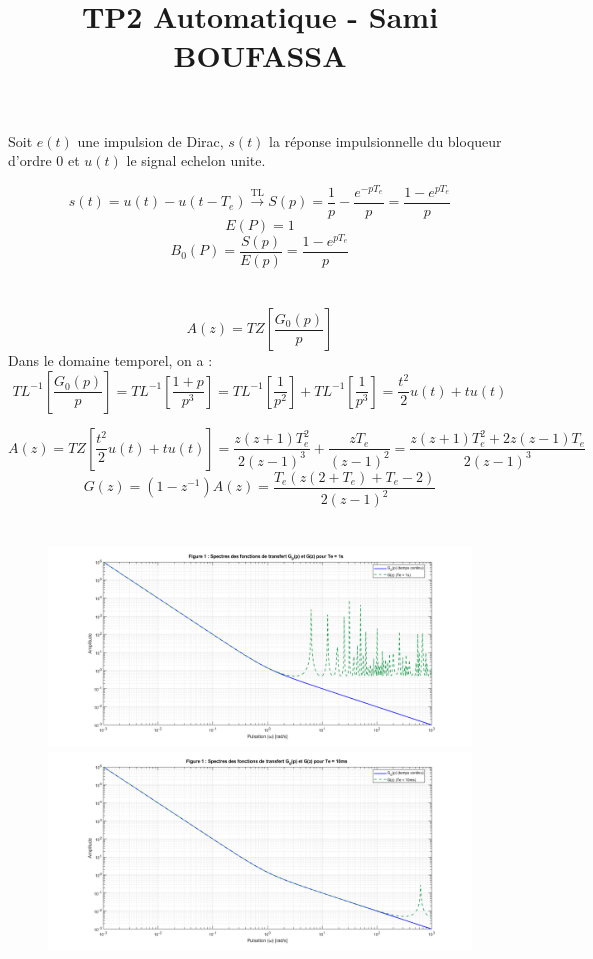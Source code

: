 \documentclass[14pt]{extarticle}
\title{TP2 Automatique - Sami BOUFASSA}
\begin{document}
\maketitle


\section{}

Soit $e(t)$ une impulsion de Dirac, $s(t)$ la réponse impulsionnelle du bloqueur d'ordre 0 et $u(t)$ le signal echelon unite. 


\[ s(t) = u(t) - u(t-T_e) \xrightarrow{\text{TL}} S(p) = \frac{1}{p} - \frac{e^{-pT_e}}{p} = \frac{1-e^{pT_e}}{p}\]
\[E(P) = 1\] 
\[B_0(P) = \frac{S(p)}{E(p)} = \frac{1-e^{pT_e}}{p}\] 


\section{}
\[A(z) = TZ[\frac{G_0(p)}{p}]\]
Dans le domaine temporel, on a :
\[TL^{-1}[\frac{G_0(p)}{p}] = TL^{-1}[\frac{1+p}{p^3}] = TL^{-1}[\frac{1}{p^2}] + TL^{-1}[\frac{1}{p^3}] = \frac{t^2}{2}u(t) + tu(t)\]

\[A(z) = TZ[\frac{t^2}{2}u(t) + tu(t)] = \frac{z(z+1)T_{e}^2}{2(z-1)^3} + \frac{zT_e}{(z-1)^2} = \frac{z(z+1)T_e^2+2z(z-1)T_e}{2(z-1)^3}\] 
\[G(z)= (1-z^{-1})A(z) = \frac{T_e(z(2+T_e)+T_e -2)}{2(z-1)^2}\]
\break
\section{}


\begin{figure}[tbh]
\vspace{0.1cm}
    \centering
    \includegraphics[width=\columnwidth]{tp2_3.png}
    \includegraphics[width=\columnwidth]{tp2_3b.png}

\end{figure}
\end{document}
